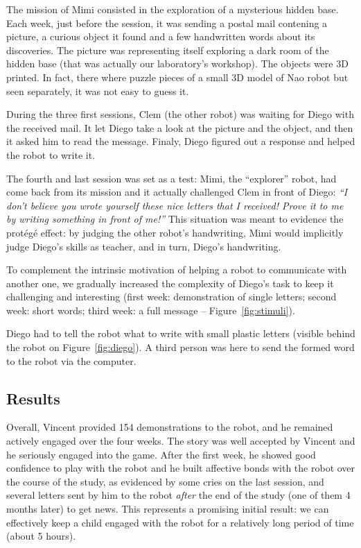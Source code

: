 \documentclass{sig-alternate}
\begin{document}
The mission of Mimi consisted in the exploration of a mysterious hidden
base. Each week, just before the session, it was sending a postal mail contening
a picture, a curious object it found and a few handwritten words about its discoveries. 
The picture was representing itself exploring 
a dark room of the hidden base (that was actually our laboratory's workshop). 
The objects were 3D printed. In fact, there where puzzle pieces of a small 3D 
model of Nao robot but seen separately, it was not easy to guess it.

During the three first sessions, Clem (the other robot) was waiting for Diego
with the received mail. It let Diego take a look at the picture and the object,
and then it asked him to read the message.
Finaly, Diego figured out a response and helped the robot to write it.

The fourth and last session was set as a test: Mimi, the ``explorer'' robot,
had come back from its mission and it actually challenged Clem in
front of Diego: \emph{``I don't believe you wrote yourself these nice letters that I
received! Prove it to me by writing something in front of me!''} This situation
was meant to evidence the prot\'eg\'e effect: by judging the other robot's
handwriting, Mimi would implicitly judge Diego's skills as
teacher, and in turn, Diego's handwriting.

To complement the intrinsic motivation of helping a robot to communicate with another one, we
gradually increased the complexity of Diego's task to keep it challenging and
interesting (first week: demonstration of single letters; second week:
short words; third week: a full message -- Figure~\ref{fig:stimuli}).

Diego had to tell the robot what to write with small plastic letters (visible
behind the robot on Figure~\ref{fig:diego}). A third person was here to send
the formed word to the robot via the computer.



\subsection{Results}
Overall, Vincent provided 154 demonstrations to the robot, and he remained
actively engaged over the four weeks. The story was well accepted by Vincent and
he seriously engaged into the game. After the first week, he showed good
confidence to play with the robot and he built affective bonds with the robot
over the course of the study, as evidenced by some cries on the last session,
and several letters sent by him to the robot \emph{after} the end of the study
(one of them 4 months later) to get news. This represents a promising initial
result: we can effectively keep a child engaged with the robot for a relatively
long period of time (about 5 hours).
\end{document}
